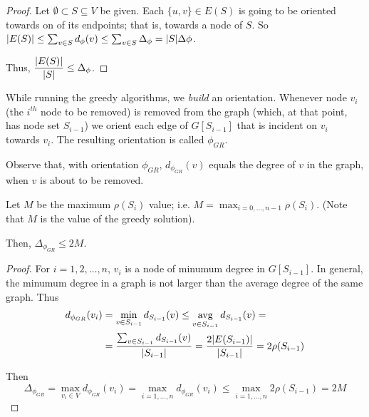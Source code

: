     \begin{proof}
        Let $\emptyset \subset S \subseteq V$ be given.
        Each $\{u,v\} \in E(S)$ is going to be oriented towards on of its endpoints; that is, towards a node of $S$.
        So $\vert E(S) \vert \leq \sum_{v \in S} d_\phi(v) \leq \sum_{v \in S} \Delta_\phi = \vert S \vert \Delta\phi$.

        Thus, $\dfrac{\vert E(S) \vert}{\vert S \vert} \leq \Delta_\phi$.
    \end{proof}

    While running the greedy algorithms, we \textit{build} an orientation.
    Whenever node $v_i$ (the $i^{th}$ node to be removed) is removed from the graph (which, at that point, has node set $S_{i-1}$) we orient each edge of $G[S_{i-1}]$ that is incident on $v_i$ towards $v_i$.
    The resulting orientation is called $\phi_{GR}$.

    Observe that, with orientation $\phi_{GR}$, $d_{\phi_{GR}}(v)$ equals the degree of $v$ in the graph, when $v$ is about to be removed.

    \begin{lemma}
        Let $M$ be the maximum $\rho(S_i)$ value; i.e. $M = \max_{i = 0,\dots,n-1} \rho(S_i)$.
        (Note that $M$ is the value of the greedy solution).

        Then, $\Delta_{\phi_{GR}} \leq 2M$.
    \end{lemma}

    \begin{proof}
        For $i = 1, 2, \dots, n$, $v_i$ is a node of minumum degree in $G[S_{i-1}]$.
        In general, the minumum degree in a graph is not larger than the average degree of the same graph.
        Thus
        \begin{equation*}
            \begin{split}
                d_{\phi_{GR}}(v_i) &= \min_{v \in S_{i-1}} d_{S_{i-1}}(v) \leq \operatorname*{avg}_{v \in S_{i-1}} d_{S_{i-1}}(v) =\\
                    &= \dfrac{\sum_{v \in S_{i-1}} d_{S_{i-1}}(v)}{\vert S_{i-1} \vert} = \dfrac{2 \vert E(S_{i-1}) \vert}{\vert S_{i-1} \vert} = 2\rho(S_{i-1})
            \end{split}
        \end{equation*}

        Then
        \[ \Delta_{\phi_{GR}} = \max_{v_i \in V} d_{\phi_{GR}}(v_i) = \max_{i=1, \dots, n} d_{\phi_{GR}}(v_i) \leq
        \max_{i=1, \dots, n} 2 \rho(S_{i-1}) = 2M \]
    \end{proof}

